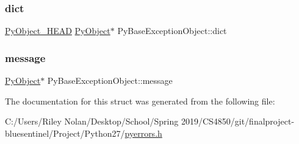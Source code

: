 \subsubsection{\texorpdfstring{dict}{dict}}
{\footnotesize\ttfamily \mbox{\hyperlink{_python27_2object_8h_a0bf35c1f3ea13f925de94d8593db3b7e}{Py\+Object\+\_\+\+H\+E\+AD}} \mbox{\hyperlink{_python27_2object_8h_aadc84ac7aed2cfa6f20c25f62bf3dac7}{Py\+Object}}$\ast$ Py\+Base\+Exception\+Object\+::dict}

\mbox{\label{struct_py_base_exception_object_a5e7baef5d9095bf3ba9f534521843a43}} 
\subsubsection{\texorpdfstring{message}{message}}
{\footnotesize\ttfamily \mbox{\hyperlink{_python27_2object_8h_aadc84ac7aed2cfa6f20c25f62bf3dac7}{Py\+Object}}$\ast$ Py\+Base\+Exception\+Object\+::message}



The documentation for this struct was generated from the following file\+:\begin{DoxyCompactItemize}
\item 
C\+:/\+Users/\+Riley Nolan/\+Desktop/\+School/\+Spring 2019/\+C\+S4850/git/finalproject-\/bluesentinel/\+Project/\+Python27/\mbox{\hyperlink{pyerrors_8h}{pyerrors.\+h}}\end{DoxyCompactItemize}
